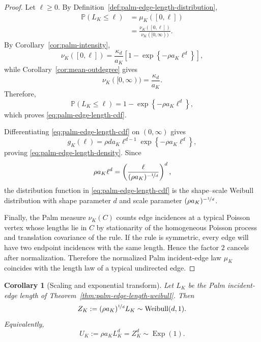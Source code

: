 \documentclass[a4paper,fleqn]{cas-dc}
\numberwithin{equation}{section}
\newcommand{\Pp}{\mathds{P}}
\newcommand{\1}{\mathds{1}}
\newcommand{\0}{\mathbf{0}}
\newtheorem{corollary}[theorem]{Corollary}
\begin{document}
\begin{proof}
Let \(\ell\geq0\). By
Definition~\ref{def:palm-edge-length-distribution},
\begin{align}
\Pp(L_K\leq\ell)
&=
\mu_K([0,\ell])
\\
&=
\frac{\nu_K([0,\ell])}
{\nu_K([0,\infty))}.
\end{align}
By Corollary~\ref{cor:palm-intensity},
\begin{equation}
\nu_K([0,\ell])
=
\frac{\kappa_d}{a_K}
\left[
1-
\exp\left\{-\rho a_K\ell^d\right\}
\right],
\end{equation}
while Corollary~\ref{cor:mean-outdegree} gives
\begin{equation}
\nu_K([0,\infty))
=
\frac{\kappa_d}{a_K}.
\end{equation}
Therefore,
\begin{equation}
\Pp(L_K\leq\ell)
=
1-
\exp\left\{-\rho a_K\ell^d\right\},
\end{equation}
which proves \eqref{eq:palm-edge-length-cdf}.

Differentiating \eqref{eq:palm-edge-length-cdf} on \((0,\infty)\)
gives
\begin{equation}
g_K(\ell)
=
\rho d a_K\ell^{d-1}
\exp\left\{-\rho a_K\ell^d\right\},
\end{equation}
proving \eqref{eq:palm-edge-length-density}. Since
\begin{equation}
\rho a_K\ell^d
=
\left(
\frac{\ell}{(\rho a_K)^{-\nicefrac{1}{d}}}
\right)^d,
\end{equation}
the distribution function in \eqref{eq:palm-edge-length-cdf} is the
shape--scale Weibull distribution with shape parameter \(d\) and scale
parameter \((\rho a_K)^{-\nicefrac{1}{d}}\).

Finally, the Palm measure
\(\nu_K(C)\) counts edge incidences at a typical Poisson vertex whose
lengths lie in \(C\) by stationarity of the homogeneous Poisson
process and translation covariance of the rule. If the rule is symmetric, every edge
will have two endpoint incidences with the same
length. Hence the factor \(2\) cancels after normalization.
Therefore the normalized Palm incident-edge law \(\mu_K\) coincides
with the length law of a typical undirected edge.
\end{proof}




\begin{corollary}[Scaling and exponential transform]
\label{cor:universal-palm-edge-scaling}
Let $L_K$ be the Palm incident-edge length of Theorem~\ref{thm:palm-edge-length-weibull}. Then
\begin{equation}\label{eq:universal-weibull-scaling}
Z_K := (\rho a_K)^{\nicefrac{1}{d}} L_K \sim \operatorname{Weibull}(d,1).
\end{equation}
Equivalently,
\begin{equation}\label{eq:exp-scale}
U_K := \rho a_K L_K^d = Z_K^d \sim \operatorname{Exp}(1).
\end{equation}
\end{corollary}
\end{document}
